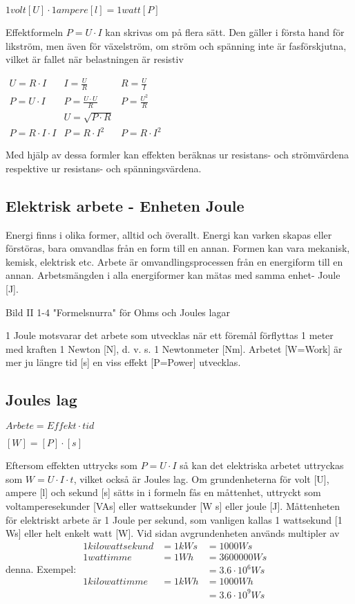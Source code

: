$1 volt [U] \cdot 1 ampere [l]= 1 watt [P]$

Effektformeln $P = U \cdot I$ kan skrivas om på
flera sätt. Den gäller i första hand för likström,
men även för växelström, om ström och
spänning inte är fasförskjutna, vilket är fallet
när belastningen är resistiv

$
\begin{array}{lll}
U = R \cdot I & I = \frac{U}{R} & R = \frac{U}{I} \\
P = U \cdot I & P = \frac{U \cdot U }{R} & P = \frac{U^2}{R} \\
&U = \sqrt{P \cdot R} & \\
P = R \cdot I \cdot I & P = R \cdot I^2 & P = R \cdot I^2
\end{array}
$

Med hjälp av dessa formler kan effekten beräknas ur resistans- och strömvärdena
respektive ur resistans- och spänningsvärdena.

\subsection{Elektrisk arbete - Enheten Joule}

Energi finns i olika former, alltid och överallt.
Energi kan varken skapas eller förstöras,
bara omvandlas från en form till en annan.
Formen kan vara mekanisk, kemisk, elektrisk etc.
Arbete är omvandlingsprocessen från
en energiform till en annan.
Arbetsmängden i alla energiformer kan
mätas med samma enhet- Joule [J].

Bild II 1-4 "Formelsnurra" för
Ohms och Joules lagar

1 Joule motsvarar det arbete som utvecklas när ett föremål förflyttas 1 meter
med kraften 1 Newton [N], d. v. s. 1 Newtonmeter [Nm].
Arbetet [W=Work] är mer ju längre tid [s]
en viss effekt [P=Power] utvecklas.

\subsection{Joules lag}

$Arbete = Effekt \cdot tid$

$[W] = [P] \cdot [s]$

Eftersom effekten uttrycks som $P = U \cdot I$
så kan det elektriska arbetet uttryckas som
$W = U \cdot I \cdot t$, vilket också är Joules lag.
Om grundenheterna för volt [U], ampere
[l] och sekund [s] sätts in i formeln fås en
måttenhet, uttryckt som voltamperesekunder
[VAs] eller wattsekunder [W s] eller joule [J].
Måttenheten för elektriskt arbete är 1
Joule per sekund, som vanligen kallas 1
wattsekund [1 Ws] eller helt enkelt watt [W].
Vid sidan avgrundenheten används multipler
av denna.
Exempel:
$
\begin{array}{lll}
1 kilowattsekund & = 1 kWs & = 1 000 Ws \\
1 wattimme & = 1 Wh & = 3600000 Ws \\
 & & = 3.6 · 10^6 Ws \\
1 kilowattimme & = 1 kWh & = 1 000 Wh \\
 & & = 3.6 · 10^9 Ws
\end{array}
$

